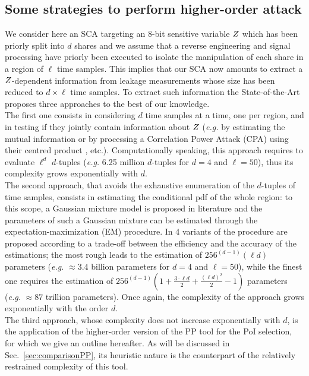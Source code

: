 \subsection{Some strategies to perform higher-order attack}\label{sec:example}
We consider here an SCA targeting an $8$-bit sensitive variable $Z$ which has been priorly split into $d$ shares and we assume that a reverse engineering and signal processing have priorly been executed to isolate the manipulation of each share  in a region of $\ell$ time samples. This implies that our SCA  now amounts to extract a $Z$-dependent information from leakage measurements whose size has been reduced to $d\times \ell$ time samples. To extract such information the State-of-the-Art proposes three approaches to the best of our knowledge.\\

The first one consists in considering $d$ time samples  at a time, one per region, and in testing if they jointly contain information about $Z$ (\emph{e.g.} by estimating the mutual information  \cite{Reparaz2012} or by processing a Correlation Power Attack (CPA) using their centred product \cite{chari1999towards}, etc.). Computationally speaking, this approach requires to evaluate $\ell^d$ $d$-tuples (\emph{e.g.} 6.25 million $d$-tuples for $d=4$ and $\ell=50$), thus its complexity grows exponentially with $d$. \\

The second approach, that avoids the exhaustive enumeration of the $d$-tuples of time samples, consists in estimating the conditional pdf of the whole region: 
to this scope, a Gaussian mixture model is proposed in literature \cite{lemke2007gaussian,Lomne2014} and the parameters of such a Gaussian mixture can be estimated through the expectation-maximization (EM) procedure. In \cite{lemke2007gaussian} 4 variants of the procedure are proposed according to a trade-off between the efficiency and the accuracy of the estimations;  the most rough leads to the estimation of  $256^{(d-1)}(\ell d)$  parameters (\emph{e.g.} $\approx 3.4 $ billion parameters for $d=4$ and $\ell=50$), while the finest one requires the estimation of $256^{(d-1)}(1 + \frac{3\cdot \ell d}{2} + \frac{(\ell d)^2}{2}-1)$ parameters (\emph{e.g.} $\approx 87$ trillion parameters). Once again, the complexity of the approach grows exponentially with the order $d$.\\

The third approach, whose complexity does not increase exponentially with $d$, is the application of the higher-order version of the PP tool for the PoI selection, for which we give an outline hereafter. As will be discussed in Sec.~\ref{sec:comparisonPP}, its heuristic nature is the counterpart of the relatively restrained complexity of this tool. \\

